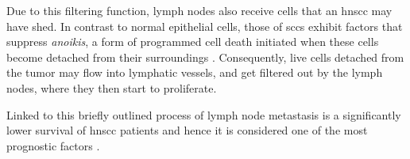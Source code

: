 \documentclass[\relativeRoot/main.tex]{subfiles}
\begin{document}
Due to this filtering function, lymph nodes also receive cells that an \gls{hnscc} may have shed. In contrast to normal epithelial cells, those of \glspl{scc} exhibit factors that suppress \emph{anoikis}, a form of programmed cell death initiated when these cells become detached from their surroundings \cite{peltanova_effect_2019}. Consequently, live cells detached from the tumor may flow into lymphatic vessels, and get filtered out by the lymph nodes, where they then start to proliferate.

Linked to this briefly outlined process of lymph node metastasis is a significantly lower survival of \gls{hnscc} patients and hence it is considered one of the most prognostic factors \cite{jones_level_1994,lim_distributions_2006,takes_staging_2004}.
\end{document}
